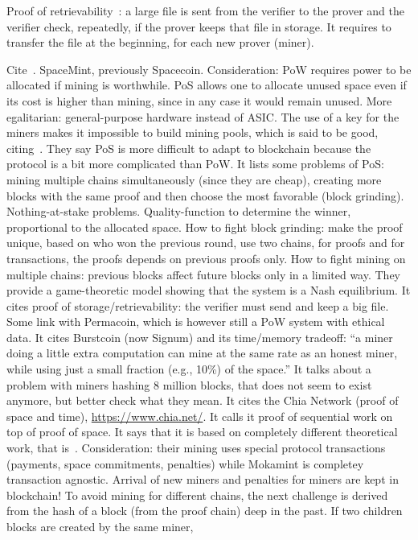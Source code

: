 Proof of retrievability~\cite{JuelsK07}: a large file
is sent from the verifier to the prover and the verifier
check, repeatedly, if the prover keeps that file in storage. It requires to transfer the file
at the beginning, for each new prover (miner).

Cite~\cite{ParkKFGAP18}. SpaceMint, previously Spacecoin. Consideration: PoW requires power
to be allocated if mining is worthwhile. PoS allows one to allocate unused space even if its
cost is higher than mining, since in any case it would remain unused. More egalitarian:
general-purpose hardware instead of ASIC. The use of a key for the miners makes it
impossible to build mining pools, which is said to be good, citing~\cite{MillerKKS15}.
They say PoS is more difficult to adapt to blockchain because the protocol is a bit
more complicated than PoW. It lists some problems of PoS: mining multiple chains simultaneously
(since they are cheap), creating more blocks with the same proof and then choose the most
favorable (block grinding). Nothing-at-stake problems. Quality-function to determine the winner, proportional
to the allocated space. How to fight block grinding: make the proof unique, based
on who won the previous round, use
two chains, for proofs and for transactions, the proofs depends on previous proofs only.
How to fight mining on multiple chains: previous blocks affect future blocks only in a limited way.
They provide a game-theoretic model showing that the system is a Nash equilibrium.
It cites proof of storage/retrievability: the verifier must send and keep a big file.
Some link with Permacoin, which is however still a PoW system with ethical data.
It cites Burstcoin (now Signum) and its time/memory tradeoff:
``a miner doing a little extra computation can mine at the same
rate as an honest miner, while using just a small fraction (e.g., 10\%) of the space.''
It talks about a problem with miners hashing 8 million blocks, that does not seem to exist
anymore, but better check what they mean.
It cites the Chia Network (proof of space and time), \url{https://www.chia.net/}.
It calls it proof of sequential work on top of proof of space.
It says that it is based on completely different theoretical work, that is~\cite{AbusalahACKPR17}.
Consideration: their mining uses special protocol transactions
(payments, space commitments, penalties) while Mokamint is completey transaction agnostic.
Arrival of new miners and penalties for miners are kept in blockchain!
To avoid mining for different chains, the next challenge is derived from the hash of a block
(from the proof chain) deep in the past. If two children blocks are created by the same miner,
